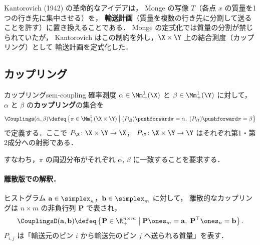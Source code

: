 Kantorovich (1942) の革命的なアイデアは，
Monge の写像 $T$（各点 $x$ の質量を1つの行き先に集中させる）を，
\textbf{輸送計画}（質量を複数の行き先に分割して送ることを許す）に置き換えることである．
Monge の定式化では質量の分割が禁じられていたが，
Kantorovich はこの制約を外し，$\X \times \Y$ 上の結合測度（カップリング）として
輸送計画を定式化した．

\subsection{カップリング}

\begin{definition}{カップリング}{sem-coupling}
  確率測度 $\alpha \in \Mm_+^1(\X)$ と $\beta \in \Mm_+^1(\Y)$ に対して，
  $\alpha$ と $\beta$ の\textbf{カップリング}の集合を
  \[
    \Couplings(\alpha, \beta) \defeq
    \left\{ \pi \in \Mm_+^1(\X \times \Y) \;\middle|\;
    (P_\X)\pushforward \pi = \alpha, \;
    (P_\Y)\pushforward \pi = \beta \right\}
  \]
  で定義する．ここで $P_\X \colon \X \times \Y \to \X$，
  $P_\Y \colon \X \times \Y \to \Y$ はそれぞれ第1・第2成分への射影である．
\end{definition}

すなわち，$\pi$ の周辺分布がそれぞれ $\alpha$, $\beta$ に一致することを要求する．

\paragraph{離散版での解釈．}
ヒストグラム $\mathbf{a} \in \simplex_n$，$\mathbf{b} \in \simplex_m$ に対して，
離散的なカップリングは $n \times m$ の非負行列 $\mathbf{P}$ で表され，
\[
  \CouplingsD(\mathbf{a}, \mathbf{b}) \defeq
  \left\{ \mathbf{P} \in \R_+^{n \times m} \;\middle|\;
  \mathbf{P} \ones_m = \mathbf{a}, \;
  \mathbf{P}^\top \ones_n = \mathbf{b} \right\}.
\]
$P_{i,j}$ は「輸送元のビン $i$ から輸送先のビン $j$ へ送られる質量」を表す．

